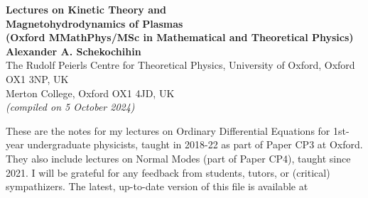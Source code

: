 \documentclass[twoside,a4paper,12pt]{article} %
\begin{document}

\renewcommand{\contentsname}{CONTENTS}


\begin{center}
    \thispagestyle{firstpage} %
    \vspace*{10pt} %
    {\LARGE \textbf{Lectures on Kinetic Theory and\\ Magnetohydrodynamics of Plasmas}} \\[1em]
    {\small{\textbf{(Oxford MMathPhys/MSc in Mathematical and Theoretical Physics)}}} \\[1.5em]
    {\large \textbf{ Alexander A. Schekochihin}} \\[0.5em]
    {\small The Rudolf Peierls Centre for Theoretical Physics, University of Oxford, Oxford OX1 3NP, UK}\\
    {\small Merton College, Oxford OX1 4JD, UK}\\[1em]
    {\small \textit{(compiled on 5 October 2024)}}
\end{center}

\noindent These are the notes for my lectures on Ordinary Differential Equations for 1st-year
undergraduate physicists, taught in 2018-22 as part of Paper CP3 at Oxford. They also
include lectures on Normal Modes (part of Paper CP4), taught since 2021. I will be
grateful for any feedback from students, tutors, or (critical) sympathizers. The latest,
up-to-date version of this file is available at\\
\end{document}
